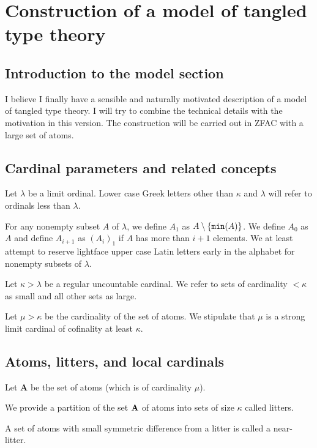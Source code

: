 \documentclass[12pt]{article}
\begin{document}
\newpage

\section{Construction of a model of tangled type theory}

\subsection{Introduction to the model section}

I believe I finally have a sensible and naturally motivated description of a model of tangled type theory.  I will try to combine the technical details with the motivation in this version.  The construction will be carried out in ZFAC  with a large set of atoms. 

\subsection{Cardinal parameters and related concepts}

Let $\lambda$ be a limit ordinal.  Lower case Greek letters other than $\kappa$ and $\lambda$  will refer to ordinals less than $\lambda$.

For any nonempty subset $A$ of $\lambda$, we define $A_1$ as $A \setminus \{{\tt min}(A)\}$.  We define $A_0$ as $A$ and define $A_{i+1}$ as $(A_i)_1$ if $A$ has more than $i+1$ elements. We at least attempt to reserve lightface  upper case Latin letters early in the alphabet for nonempty subsets of $\lambda$.

Let $\kappa>\lambda$ be a regular uncountable cardinal.  We refer to sets of cardinality $<\kappa$ as small and all other sets as large.

Let $\mu>\kappa$ be the cardinality of the set of atoms.  We stipulate that $\mu$ is a strong limit cardinal of cofinality at least $\kappa$.

\subsection{Atoms, litters, and local cardinals}

Let {\bf A} be the set of atoms (which is of cardinality $\mu$).

We provide a partition of the set ${\bf A}$ of atoms into sets of size $\kappa$ called litters.

A set of atoms with small symmetric difference from a litter is called a near-litter.  
\end{document}
